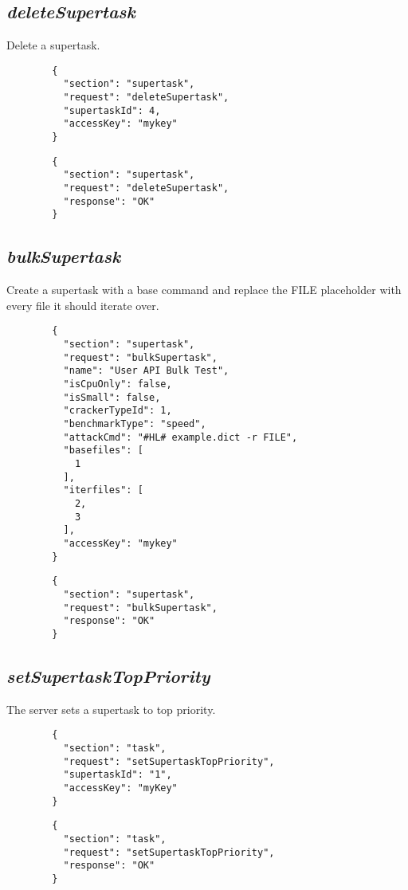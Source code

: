 \subsection*{\textit{deleteSupertask}}
	Delete a supertask.
	{
		\color{blue}
		\begin{verbatim}
		{
		  "section": "supertask",
		  "request": "deleteSupertask",
		  "supertaskId": 4,
		  "accessKey": "mykey"
		}
		\end{verbatim}
	}
	{
		\color{OliveGreen}
		\begin{verbatim}
		{
		  "section": "supertask",
		  "request": "deleteSupertask",
		  "response": "OK"
		}
		\end{verbatim}
	}
\subsection*{\textit{bulkSupertask}}
	Create a supertask with a base command and replace the FILE placeholder with every file it should iterate over.
	{
		\color{blue}
		\begin{verbatim}
		{
		  "section": "supertask",
		  "request": "bulkSupertask",
		  "name": "User API Bulk Test",
		  "isCpuOnly": false,
		  "isSmall": false,
		  "crackerTypeId": 1,
		  "benchmarkType": "speed",
		  "attackCmd": "#HL# example.dict -r FILE",
		  "basefiles": [
		    1
		  ],
		  "iterfiles": [
		    2,
		    3
		  ],
		  "accessKey": "mykey"
		}
		\end{verbatim}
	}
	{
		\color{OliveGreen}
		\begin{verbatim}
		{
		  "section": "supertask",
		  "request": "bulkSupertask",
		  "response": "OK"
		}
		\end{verbatim}
	}
\subsection*{\textit{setSupertaskTopPriority}}
	The server sets a supertask to top priority.
	{
		\color{blue}
		\begin{verbatim}
		{
		  "section": "task",
		  "request": "setSupertaskTopPriority",
		  "supertaskId": "1",
		  "accessKey": "myKey"
		}
		\end{verbatim}
	}
	{
		\color{OliveGreen}
		\begin{verbatim}
		{
		  "section": "task",
		  "request": "setSupertaskTopPriority",
		  "response": "OK"
		}
		\end{verbatim}
	}



